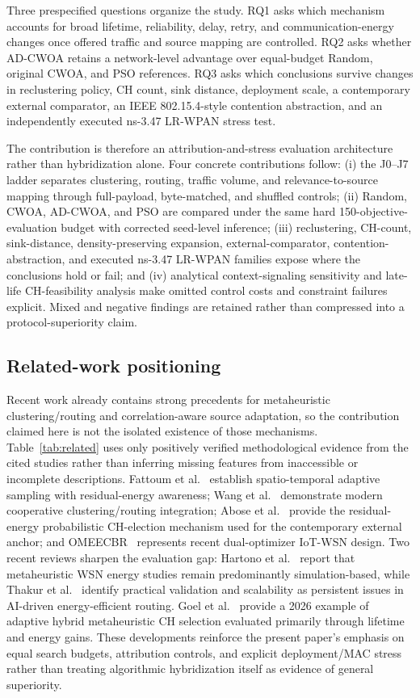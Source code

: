 \documentclass[pdflatex,sn-mathphys-num]{sn-jnl}
\begin{document}
Three prespecified questions organize the study. RQ1 asks which mechanism accounts for broad lifetime, reliability, delay, retry, and communication-energy changes once offered traffic and source mapping are controlled. RQ2 asks whether AD-CWOA retains a network-level advantage over equal-budget Random, original CWOA, and PSO references. RQ3 asks which conclusions survive changes in reclustering policy, CH count, sink distance, deployment scale, a contemporary external comparator, an IEEE 802.15.4-style contention abstraction, and an independently executed ns-3.47 LR-WPAN stress test.

The contribution is therefore an attribution-and-stress evaluation architecture rather than hybridization alone. Four concrete contributions follow: (i) the J0--J7 ladder separates clustering, routing, traffic volume, and relevance-to-source mapping through full-payload, byte-matched, and shuffled controls; (ii) Random, CWOA, AD-CWOA, and PSO are compared under the same hard 150-objective-evaluation budget with corrected seed-level inference; (iii) reclustering, CH-count, sink-distance, density-preserving expansion, external-comparator, contention-abstraction, and executed ns-3.47 LR-WPAN families expose where the conclusions hold or fail; and (iv) analytical context-signaling sensitivity and late-life CH-feasibility analysis make omitted control costs and constraint failures explicit. Mixed and negative findings are retained rather than compressed into a protocol-superiority claim.

\subsection{Related-work positioning}

Recent work already contains strong precedents for metaheuristic clustering/routing and correlation-aware source adaptation, so the contribution claimed here is not the isolated existence of those mechanisms. Table~\ref{tab:related} uses only positively verified methodological evidence from the cited studies rather than inferring missing features from inaccessible or incomplete descriptions. Fattoum et al.~\cite{fattoum2023} establish spatio-temporal adaptive sampling with residual-energy awareness; Wang et al.~\cite{wang2023} demonstrate modern cooperative clustering/routing integration; Abose et al.~\cite{abose2024} provide the residual-energy probabilistic CH-election mechanism used for the contemporary external anchor; and OMEECBR~\cite{edakulathur2025} represents recent dual-optimizer IoT-WSN design. Two recent reviews sharpen the evaluation gap: Hartono et al.~\cite{hartono2026} report that metaheuristic WSN energy studies remain predominantly simulation-based, while Thakur et al.~\cite{thakur2025} identify practical validation and scalability as persistent issues in AI-driven energy-efficient routing. Goel et al.~\cite{goel2026} provide a 2026 example of adaptive hybrid metaheuristic CH selection evaluated primarily through lifetime and energy gains. These developments reinforce the present paper's emphasis on equal search budgets, attribution controls, and explicit deployment/MAC stress rather than treating algorithmic hybridization itself as evidence of general superiority.
\end{document}
